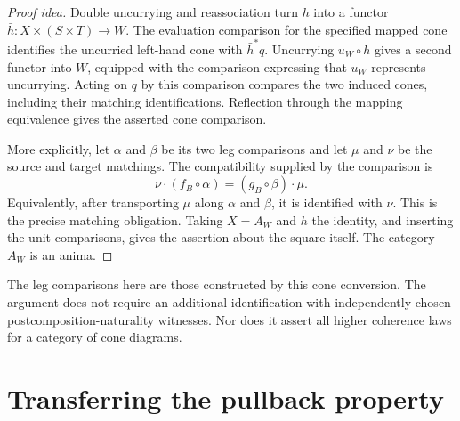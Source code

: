 \documentclass[11pt]{article}
\begin{document}
\begin{proof}[Proof idea]
Double uncurrying and reassociation turn $h$ into a functor
$\bar h\colon X\times(S\times T)\to W$. The evaluation comparison for
the specified mapped cone identifies the uncurried left-hand cone with
$\bar h^*q$. Uncurrying $u_W\circ h$ gives a second functor into $W$,
equipped with the comparison expressing that $u_W$ represents uncurrying.
Acting on $q$ by this comparison compares the two induced cones, including
their matching identifications. Reflection through the mapping equivalence
gives the asserted cone comparison.

More explicitly, let $\alpha$ and $\beta$ be its two leg comparisons and
let $\mu$ and $\nu$ be the source and target matchings. The compatibility
supplied by the comparison is
\[
 \nu\cdot(f_B\circ\alpha)=(g_B\circ\beta)\cdot\mu.
\]
Equivalently, after transporting $\mu$ along $\alpha$ and $\beta$, it is
identified with $\nu$. This is the precise matching obligation. Taking
$X=A_W$ and $h$ the identity, and inserting the unit comparisons, gives the
assertion about the square itself. The category $A_W$ is an anima.
\end{proof}

The leg comparisons here are those constructed by this cone conversion.
The argument does not require an additional identification with independently
chosen postcomposition-naturality witnesses. Nor does it assert all higher
coherence laws for a category of cone diagrams.

\section*{Transferring the pullback property}
\end{document}
